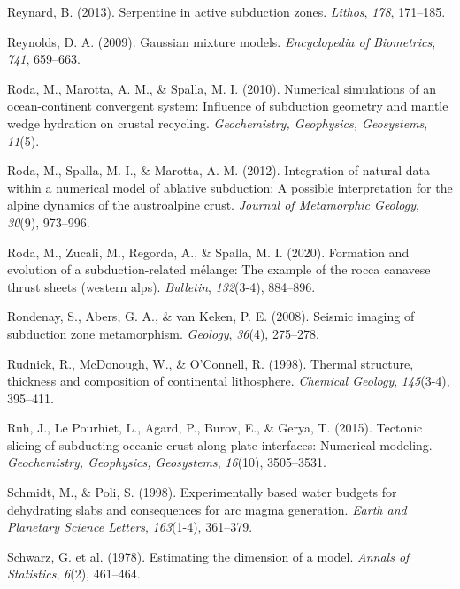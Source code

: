 \begin{CSLReferences}{1}{1}
\leavevmode{}%
Reynard, B. (2013). Serpentine in active subduction zones. \emph{Lithos}, \emph{178}, 171--185.

\leavevmode{}%
Reynolds, D. A. (2009). Gaussian mixture models. \emph{Encyclopedia of Biometrics}, \emph{741}, 659--663.

\leavevmode{}%
Roda, M., Marotta, A. M., \& Spalla, M. I. (2010). Numerical simulations of an ocean-continent convergent system: Influence of subduction geometry and mantle wedge hydration on crustal recycling. \emph{Geochemistry, Geophysics, Geosystems}, \emph{11}(5).

\leavevmode{}%
Roda, M., Spalla, M. I., \& Marotta, A. M. (2012). Integration of natural data within a numerical model of ablative subduction: A possible interpretation for the alpine dynamics of the austroalpine crust. \emph{Journal of Metamorphic Geology}, \emph{30}(9), 973--996.

\leavevmode{}%
Roda, M., Zucali, M., Regorda, A., \& Spalla, M. I. (2020). Formation and evolution of a subduction-related m{é}lange: The example of the rocca canavese thrust sheets (western alps). \emph{Bulletin}, \emph{132}(3-4), 884--896.

\leavevmode{}%
Rondenay, S., Abers, G. A., \& van Keken, P. E. (2008). Seismic imaging of subduction zone metamorphism. \emph{Geology}, \emph{36}(4), 275--278.

\leavevmode{}%
Rudnick, R., McDonough, W., \& O'Connell, R. (1998). Thermal structure, thickness and composition of continental lithosphere. \emph{Chemical Geology}, \emph{145}(3-4), 395--411.

\leavevmode{}%
Ruh, J., Le Pourhiet, L., Agard, P., Burov, E., \& Gerya, T. (2015). Tectonic slicing of subducting oceanic crust along plate interfaces: Numerical modeling. \emph{Geochemistry, Geophysics, Geosystems}, \emph{16}(10), 3505--3531.

\leavevmode{}%
Schmidt, M., \& Poli, S. (1998). Experimentally based water budgets for dehydrating slabs and consequences for arc magma generation. \emph{Earth and Planetary Science Letters}, \emph{163}(1-4), 361--379.

\leavevmode{}%
Schwarz, G. et al. (1978). Estimating the dimension of a model. \emph{Annals of Statistics}, \emph{6}(2), 461--464.


\end{CSLReferences}
